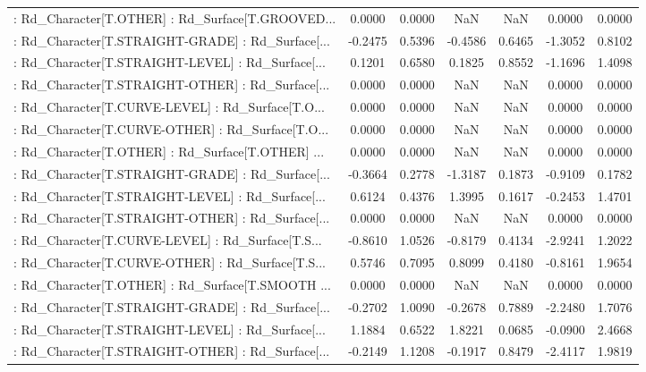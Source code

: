 \begin{longtable}{p{4cm}cccccc}
 : Rd\_Character[T.OTHER] : Rd\_Surface[T.GROOVED... &  0.0000 &    0.0000 &     NaN &          NaN &  0.0000 &  0.0000 \\
 : Rd\_Character[T.STRAIGHT-GRADE] : Rd\_Surface[... & -0.2475 &    0.5396 & -0.4586 &       0.6465 & -1.3052 &  0.8102 \\
 : Rd\_Character[T.STRAIGHT-LEVEL] : Rd\_Surface[... &  0.1201 &    0.6580 &  0.1825 &       0.8552 & -1.1696 &  1.4098 \\
 : Rd\_Character[T.STRAIGHT-OTHER] : Rd\_Surface[... &  0.0000 &    0.0000 &     NaN &          NaN &  0.0000 &  0.0000 \\
 : Rd\_Character[T.CURVE-LEVEL] : Rd\_Surface[T.O... &  0.0000 &    0.0000 &     NaN &          NaN &  0.0000 &  0.0000 \\
 : Rd\_Character[T.CURVE-OTHER] : Rd\_Surface[T.O... &  0.0000 &    0.0000 &     NaN &          NaN &  0.0000 &  0.0000 \\
 : Rd\_Character[T.OTHER] : Rd\_Surface[T.OTHER] ... &  0.0000 &    0.0000 &     NaN &          NaN &  0.0000 &  0.0000 \\
 : Rd\_Character[T.STRAIGHT-GRADE] : Rd\_Surface[... & -0.3664 &    0.2778 & -1.3187 &       0.1873 & -0.9109 &  0.1782 \\
 : Rd\_Character[T.STRAIGHT-LEVEL] : Rd\_Surface[... &  0.6124 &    0.4376 &  1.3995 &       0.1617 & -0.2453 &  1.4701 \\
 : Rd\_Character[T.STRAIGHT-OTHER] : Rd\_Surface[... &  0.0000 &    0.0000 &     NaN &          NaN &  0.0000 &  0.0000 \\
 : Rd\_Character[T.CURVE-LEVEL] : Rd\_Surface[T.S... & -0.8610 &    1.0526 & -0.8179 &       0.4134 & -2.9241 &  1.2022 \\
 : Rd\_Character[T.CURVE-OTHER] : Rd\_Surface[T.S... &  0.5746 &    0.7095 &  0.8099 &       0.4180 & -0.8161 &  1.9654 \\
 : Rd\_Character[T.OTHER] : Rd\_Surface[T.SMOOTH ... &  0.0000 &    0.0000 &     NaN &          NaN &  0.0000 &  0.0000 \\
 : Rd\_Character[T.STRAIGHT-GRADE] : Rd\_Surface[... & -0.2702 &    1.0090 & -0.2678 &       0.7889 & -2.2480 &  1.7076 \\
 : Rd\_Character[T.STRAIGHT-LEVEL] : Rd\_Surface[... &  1.1884 &    0.6522 &  1.8221 &       0.0685 & -0.0900 &  2.4668 \\
 : Rd\_Character[T.STRAIGHT-OTHER] : Rd\_Surface[... & -0.2149 &    1.1208 & -0.1917 &       0.8479 & -2.4117 &  1.9819 \\

\end{longtable}
